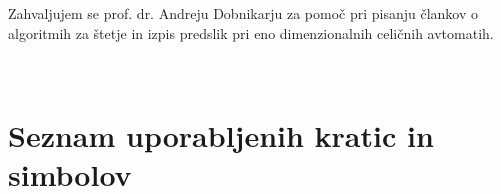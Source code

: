 \documentclass[12pt,a4paper,openany,twoside]{book}
\begin{document}
Zahvaljujem se prof. dr. Andreju Dobnikarju za pomoč pri pisanju člankov
o algoritmih za štetje in izpis predslik pri eno dimenzionalnih celičnih avtomatih.

\newpage

\ \thispagestyle{empty}

\newpage

\renewcommand\thepage{} 
\tableofcontents 
\renewcommand\thepage{\arabic{page}}

\thispagestyle{empty}


\chapter*{Seznam uporabljenih kratic in simbolov}

\thispagestyle{empty}

\end{document}
